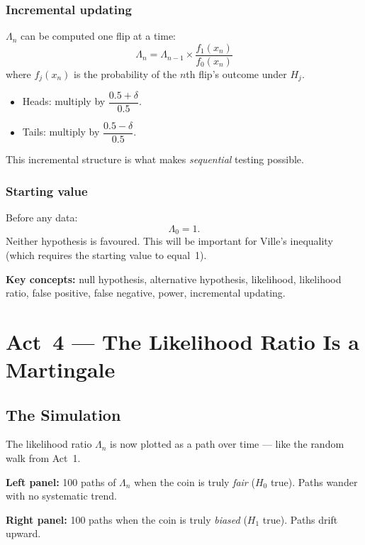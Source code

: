 \documentclass[12pt, a4paper]{article}
\newcommand{\LR}{\Lambda}              %
\begin{document}
\subsubsection*{Incremental updating}

$\LR_n$ can be computed one flip at a time:
\[
  \boxed{\LR_n = \LR_{n-1} \times \frac{f_1(x_n)}{f_0(x_n)}}
\]
where $f_j(x_n)$ is the probability of the $n$th flip's outcome under $H_j$.
\begin{itemize}[nosep]
  \item Heads: multiply by $\dfrac{0.5+\delta}{0.5}$.
  \item Tails: multiply by $\dfrac{0.5-\delta}{0.5}$.
\end{itemize}
This incremental structure is what makes \emph{sequential} testing possible.

\subsubsection*{Starting value}

Before any data:
\[
  \LR_0 = 1.
\]
Neither hypothesis is favoured.  This will be important for Ville's inequality
(which requires the starting value to equal~1).

\begin{keytakeaway}
\textbf{Key concepts:} null hypothesis, alternative hypothesis, likelihood,
likelihood ratio, false positive, false negative, power, incremental updating.
\end{keytakeaway}


\newpage
\section{Act~4 --- The Likelihood Ratio Is a Martingale}

\subsection{The Simulation}

\begin{simulation}
The likelihood ratio $\LR_n$ is now plotted as a path over time --- like the
random walk from Act~1.

\textbf{Left panel:} 100 paths of $\LR_n$ when the coin is truly \emph{fair}
($H_0$ true).  Paths wander with no systematic trend.

\textbf{Right panel:} 100 paths when the coin is truly \emph{biased}
($H_1$ true).  Paths drift upward.
\end{simulation}
\end{document}
